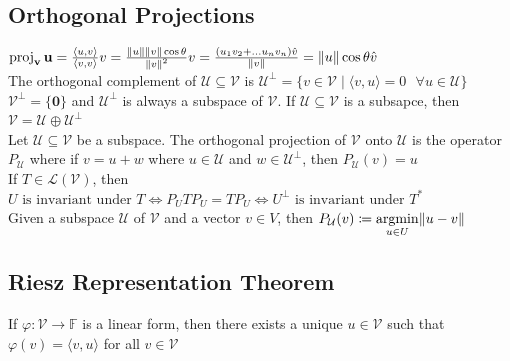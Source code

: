 \documentclass{article}
\DeclarePairedDelimiter\norm{\lVert}{\rVert}%
\DeclareMathOperator{\PProjection}{proj}
\DeclareMathOperator*{\argmin}{argmin}
\newcommand{\F}{\mathbb{F}}
\newcommand{\linear}{\mathcal{L}}
\newcommand{\U}{\mathcal{U}}
\newcommand{\V}{\mathcal{V}}
\newcommand\inner[2]{\langle #1, #2 \rangle}
\newcommand{\vct}{\mathbf}
\newcommand{\PProj}[2][]{\PProjection_{\vct{#1}}\vct{#2}}
\begin{document}
\subsection{Orthogonal Projections}
$\PProj[v] {u} = \frac{\inner{u}{v}}{\inner{v}{v}} v = \frac{\norm u \norm v \cos \theta}{{\norm v}^2}v = \frac{(u_1v_2 + \ldots u_nv_n)\hat{v}}{\norm v}  = \norm u \cos \theta \hat{v}$ \\
The orthogonal complement of $\U \subseteq \V$ is $\U^{\perp} = \{v \in \V \mid \inner{v}{u} = 0 \mbox{ }\forall u \in \U \}$ \\
$\V^{\perp} = \{\boldsymbol{0}\}$ and $\U^{\perp}$ is always a subspace of $\V$. If $\U \subseteq \V$ is a subsapce, then $\V = \U \oplus \U^{\perp}$ \\
Let $\U \subseteq \V$ be a subspace. The orthogonal projection of $\V$ onto $\U$ is the operator $P_{\U}$ where if $v = u + w$ where $u \in \U$ and $w \in \U^{\perp}$, then $P_{\U}(v) = u$ \\
If $T \in \linear(\V)$, then $U\mbox{ is invariant under }T \iff P_UTP_U = TP_U \iff U^\perp \mbox{ is invariant under }T^*$ \\
Given a subspace $\U$ of $\V$ and a vector $v \in V$, then $P_{\U}(v) \coloneqq \argmin\limits_{u \in U} \norm{u - v}$ 


\subsection{Riesz Representation Theorem}
If $\varphi: \V \rightarrow \F$ is a linear form, then there exists a unique $u \in \V$ such that $\varphi(v) = \inner v u$ for all $v \in \V$
\end{document}
